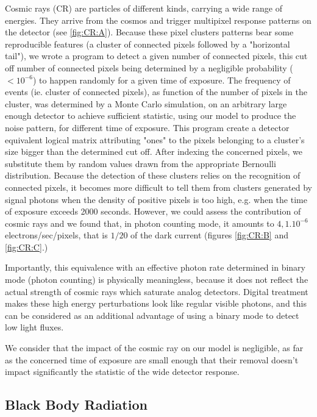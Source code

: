 Cosmic rays (CR) are particles of different kinds, carrying a wide range of energies. They arrive from the cosmos and trigger multipixel response patterns on the detector (see \ref{fig:CR:A}). 
Because these pixel clusters patterns bear some reproducible features (a cluster of connected pixels followed by a "horizontal tail"), we wrote a program to detect a given number of connected pixels, this cut off number of connected pixels being determined by a negligible probability ($<10^{-6}$) to happen randomly for a given time of exposure. The frequency of events (ie. cluster of connected pixels), as function of the number of pixels in the cluster, was determined by a Monte Carlo simulation, on an arbitrary large enough detector to achieve sufficient statistic, using our model to produce the noise pattern, for different time of exposure. This program create a detector equivalent logical matrix attributing "ones" to the pixels belonging to a cluster's size bigger than the determined cut off. After indexing the concerned pixels, we substitute them by random values drawn from the appropriate Bernoulli distribution.
Because the detection of these clusters relies on the recognition of connected pixels, it becomes more difficult to tell them from clusters generated by signal photons when the density of positive pixels is too high, e.g. when the time of exposure exceeds 2000 seconds. 
However, we could assess the contribution of cosmic rays and we found that, in photon counting mode, it amounts to $4,1.10^{-6}$ electrons/sec/pixels, that is $1/20$ of the dark current (figures \ref{fig:CR:B} and  \ref{fig:CR:C}.) \par

Importantly, this equivalence with an effective photon rate determined in binary mode (photon counting) is physically meaningless, because it does not reflect the actual strength of cosmic rays which saturate analog detectors.
Digital treatment makes these high energy perturbations look like regular visible photons, and this can be considered as an additional advantage of using a binary mode to detect low light fluxes. \par
We consider that the impact of the cosmic ray on our model is negligible, as far as the concerned time of exposure are small enough that their removal doesn't impact significantly the statistic of the wide detector response.\par
%


\subsection{Black Body Radiation}

